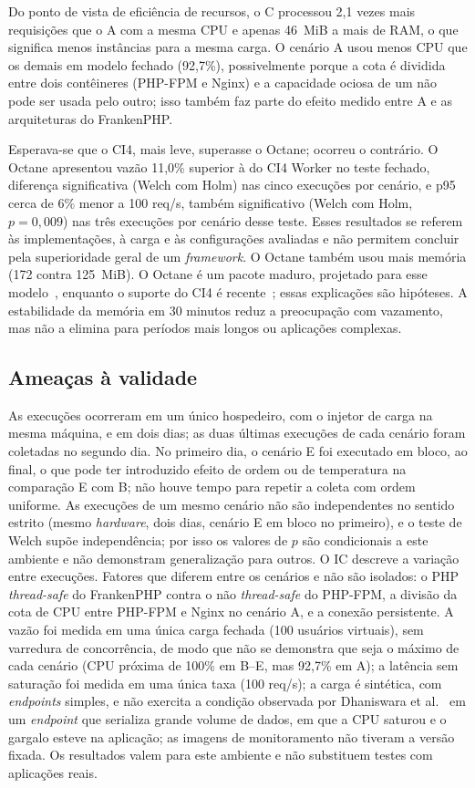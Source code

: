 \documentclass[sigconf, nonacm, screen, language=portuguese, language=spanish, language={main=english}]{acmart}
\begin{document}
Do ponto de vista de eficiência de recursos, o C processou 2,1 vezes mais requisições que o A com a mesma CPU e apenas 46~MiB a mais de RAM, o que significa menos instâncias para a mesma carga. O cenário A usou menos CPU que os demais em modelo fechado (92,7\%), possivelmente porque a cota é dividida entre dois contêineres (PHP-FPM e Nginx) e a capacidade ociosa de um não pode ser usada pelo outro; isso também faz parte do efeito medido entre A e as arquiteturas do FrankenPHP.

Esperava-se que o CI4, mais leve, superasse o Octane; ocorreu o contrário. O Octane apresentou vazão 11,0\% superior à do CI4 Worker no teste fechado, diferença significativa (Welch com Holm) nas cinco execuções por cenário, e p95 cerca de 6\% menor a 100 req/s, também significativo (Welch com Holm, $p=0{,}009$) nas três execuções por cenário desse teste. Esses resultados se referem às implementações, à carga e às configurações avaliadas e não permitem concluir pela superioridade geral de um \textit{framework}. O Octane também usou mais memória (172 contra 125~MiB). O Octane é um pacote maduro, projetado para esse modelo~\cite{otwell2024}, enquanto o suporte do CI4 é recente~\cite{codeigniter2024}; essas explicações são hipóteses. A estabilidade da memória em 30 minutos reduz a preocupação com vazamento, mas não a elimina para períodos mais longos ou aplicações complexas.

\subsection{Ameaças à validade}
As execuções ocorreram em um único hospedeiro, com o injetor de carga na mesma máquina, e em dois dias; as duas últimas execuções de cada cenário foram coletadas no segundo dia. No primeiro dia, o cenário E foi executado em bloco, ao final, o que pode ter introduzido efeito de ordem ou de temperatura na comparação E com B; não houve tempo para repetir a coleta com ordem uniforme. As execuções de um mesmo cenário não são independentes no sentido estrito (mesmo \textit{hardware}, dois dias, cenário E em bloco no primeiro), e o teste de Welch supõe independência; por isso os valores de $p$ são condicionais a este ambiente e não demonstram generalização para outros. O IC descreve a variação entre execuções. Fatores que diferem entre os cenários e não são isolados: o PHP \textit{thread-safe} do FrankenPHP contra o não \textit{thread-safe} do PHP-FPM, a divisão da cota de CPU entre PHP-FPM e Nginx no cenário A, e a conexão persistente. A vazão foi medida em uma única carga fechada (100 usuários virtuais), sem varredura de concorrência, de modo que não se demonstra que seja o máximo de cada cenário (CPU próxima de 100\% em B--E, mas 92,7\% em A); a latência sem saturação foi medida em uma única taxa (100 req/s); a carga é sintética, com \textit{endpoints} simples, e não exercita a condição observada por Dhaniswara et al.~\cite{dhaniswara2025} em um \textit{endpoint} que serializa grande volume de dados, em que a CPU saturou e o gargalo esteve na aplicação; as imagens de monitoramento não tiveram a versão fixada. Os resultados valem para este ambiente e não substituem testes com aplicações reais.
\end{document}
